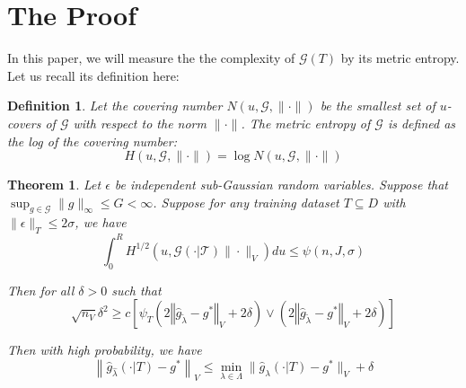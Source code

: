 \documentclass[12pt]{article}
\newtheorem{theorem}{Theorem}
\newtheorem{definition}{Definition}
\begin{document}

\section{The Proof} \label{sec:proofs}

In this paper, we will measure the the complexity of $\mathcal{G}(T)$ by its metric entropy. Let us recall its definition here:

\begin{definition}
Let the covering number $N(u, \mathcal{G}, \| \cdot \|)$ be the smallest set of $u$-covers of $\mathcal{G}$ with respect to the norm $\| \cdot \|$. The metric entropy of $\mathcal{G}$ is defined as the log of the covering number:
\begin{equation}
H (u, \mathcal{G}, \| \cdot \| ) = \log N(u, \mathcal{G}, \| \cdot \|)
\end{equation}
\end{definition}

\begin{theorem}
\label{train_val_thrm_complicated}
Let $\epsilon$ be independent sub-Gaussian random variables.
Suppose that $\sup_{g \in \mathcal{G}} \| g \|_\infty \le G < \infty$.
Suppose for any training dataset $T \subseteq D$ with $\| \epsilon \|_T \le 2 \sigma$, we have
\begin{equation}
\int_0^R H^{1/2} \left ( u, \mathcal{G(\cdot | T)} \| \cdot \|_V \right ) du \le \psi(n, J, \sigma)
\end{equation}

Then for all $\delta  > 0$ such that
\begin{equation}
\sqrt{n_{V}}\delta^{2}
\ge
c \left[
\psi_{T}\left(2\left\Vert \hat{g}_{\tilde{\lambda}}-g^{*}\right\Vert _{V} + 2\delta\right)
\vee
\left(2\left\Vert \hat{g}_{\tilde{\lambda}}-g^{*}\right\Vert _{V}+2\delta\right)
\right]
\end{equation}

Then with high probability, we have
\begin{equation}
\left \|\hat{g}_{\hat{\lambda} }(\cdot | T) - g^* \right \|_V
\le
\min_{\lambda \in \Lambda}\| \hat{g}_{\lambda}(\cdot | T) - g^*\|_V
+ \delta
\end{equation}
\end{theorem}
\end{document}
